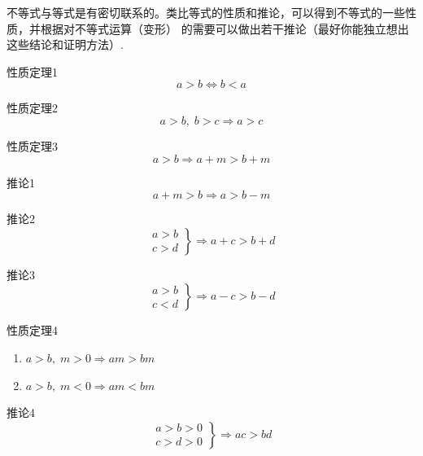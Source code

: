 不等式与等式是有密切联系的。类比等式的性质和推论，可以得到不等式的一些性质，并根据对不等式运算（变形）
的需要可以做出若干推论（最好你能独立想出这些结论和证明方法）.

\begin{thm}{性质定理1}
    \[a>b\Longleftrightarrow b<a\]
\end{thm}

\begin{thm}{性质定理2}
    \begin{equation}
        a>b,\; b>c \Longrightarrow a>c \tag{传递性}
    \end{equation}
\end{thm}

\begin{thm}{性质定理3}
    \[a>b\Longrightarrow a+m>b+m\]
\end{thm}


\begin{thm}{推论1}
    \[a+m>b\Longrightarrow a>b-m\]
\end{thm}

\begin{thm}{推论2}
    \[\left.\begin{array}{c}
        a>b\\
        c>d
    \end{array}\right\} \Longrightarrow a+c>b+d\]    
\end{thm}

\begin{thm}{推论3}
    \[\left.\begin{array}{c}
        a>b\\
        c<d
    \end{array}\right\} \Longrightarrow a-c>b-d\]    
\end{thm}


\begin{thm}{性质定理4}
\begin{enumerate}
    \item $a>b,\; m>0\Longrightarrow am>bm$
    \item $a>b,\; m<0\Longrightarrow am<bm$
\end{enumerate}
\end{thm}

\begin{thm}{推论4}
    \[\left.\begin{array}{c}
        a>b>0\\
        c>d>0
    \end{array}\right\} \Longrightarrow ac>bd\]    
\end{thm}

